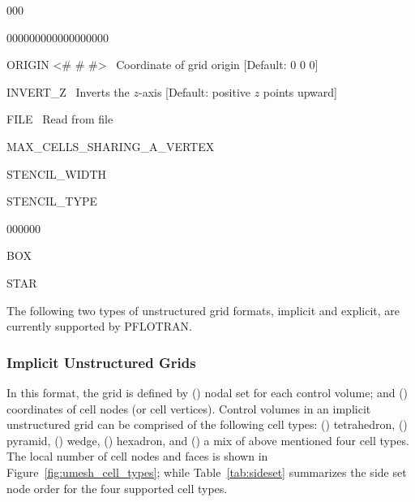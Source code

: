 \begin{deflist}{000}
\begin{deflist}{000000000000000000}
\item[ORIGIN <\# \# \#>] \ Coordinate of grid origin [Default: 0 0 0]

\item[INVERT\_Z] \ Inverts the $z$-axis [Default: positive $z$ points upward]

\item[FILE] \ Read from file
\item[MAX\_CELLS\_SHARING\_A\_VERTEX] ~
\item[STENCIL\_WIDTH] ~
\item[STENCIL\_TYPE] ~
\begin{deflist}{000000}
\item [BOX]
\item [STAR]
\end{deflist}
\end{deflist}
\item[\keyend]
\end{deflist}



\noindent
The following two types of unstructured grid formats, implicit and explicit, are currently supported by PFLOTRAN.

\subsubsection{Implicit Unstructured Grids}

In this format, the grid is defined by 
({}) nodal set for each control volume; and 
({}) coordinates of cell nodes (or cell vertices). 
Control volumes in an implicit unstructured grid can be comprised of the following
cell types:
({}) tetrahedron,
({}) pyramid,
({}) wedge, 
({}) hexadron, and
({}) a mix of above mentioned four cell types.
The local number of cell nodes and faces is shown in Figure~\ref{fig:umesh_cell_types};
while Table~\ref{tab:sideset} summarizes the side set node order for the four supported
cell types.

